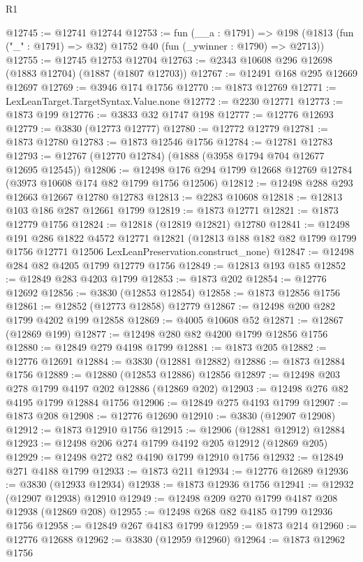 \begin{lexlean}{R1}
\begin{coremodule}
@12745 := @12741 @12744
@12753 := fun (__a : @1791) =>
  @198 (@1813 (fun ("_" : @1791) => @32) @1752 @40 (fun (_ywinner : @1790) => @2713))
@12755 := @12745 @12753 @12704
@12763 := @2343 @10608 @296 @12698 (@1883 @12704) (@1887 (@1807 @12703))
@12767 := @12491 @168 @295 @12669 @12697
@12769 := @3946 @174 @1756
@12770 := @1873 @12769
@12771 := LexLeanTarget.TargetSyntax.Value.none
@12772 := @2230 @12771
@12773 := @1873 @199
@12776 := @3833 @32 @1747 @198
@12777 := @12776 @12693
@12779 := @3830 (@12773 @12777)
@12780 := @12772 @12779
@12781 := @1873 @12780
@12783 := @1873 @12546 @1756
@12784 := @12781 @12783
@12793 := @12767 (@12770 @12784) (@1888 (@3958 @1794 @704 @12677 @12695 @12545))
@12806 := @12498 @176 @294 @1799 @12668 @12769 @12784 (@3973 @10608 @174 @82 @1799 @1756 @12506)
@12812 := @12498 @288 @293 @12663 @12667 @12780 @12783
@12813 := @2283 @10608
@12818 := @12813 @103 @186 @287 @12661 @1799
@12819 := @1873 @12771
@12821 := @1873 @12779 @1756
@12824 := @12818 (@12819 @12821) @12780
@12841 := @12498
    @191
    @286
    @1822
    @4572
    @12771
    @12821
    (@12813 @188 @182 @82 @1799 @1799 @1756 @12771 @12506 LexLeanPreservation.construct_none)
@12847 := @12498 @284 @82 @4205 @1799 @12779 @1756
@12849 := @12813 @193 @185
@12852 := @12849 @283 @4203 @1799
@12853 := @1873 @202
@12854 := @12776 @12692
@12856 := @3830 (@12853 @12854)
@12858 := @1873 @12856 @1756
@12861 := @12852 (@12773 @12858) @12779
@12867 := @12498 @200 @282 @1799 @4202 @199 @12858
@12869 := @4005 @10608 @52
@12871 := @12867 (@12869 @199)
@12877 := @12498 @280 @82 @4200 @1799 @12856 @1756
@12880 := @12849 @279 @4198 @1799
@12881 := @1873 @205
@12882 := @12776 @12691
@12884 := @3830 (@12881 @12882)
@12886 := @1873 @12884 @1756
@12889 := @12880 (@12853 @12886) @12856
@12897 := @12498 @203 @278 @1799 @4197 @202 @12886 (@12869 @202)
@12903 := @12498 @276 @82 @4195 @1799 @12884 @1756
@12906 := @12849 @275 @4193 @1799
@12907 := @1873 @208
@12908 := @12776 @12690
@12910 := @3830 (@12907 @12908)
@12912 := @1873 @12910 @1756
@12915 := @12906 (@12881 @12912) @12884
@12923 := @12498 @206 @274 @1799 @4192 @205 @12912 (@12869 @205)
@12929 := @12498 @272 @82 @4190 @1799 @12910 @1756
@12932 := @12849 @271 @4188 @1799
@12933 := @1873 @211
@12934 := @12776 @12689
@12936 := @3830 (@12933 @12934)
@12938 := @1873 @12936 @1756
@12941 := @12932 (@12907 @12938) @12910
@12949 := @12498 @209 @270 @1799 @4187 @208 @12938 (@12869 @208)
@12955 := @12498 @268 @82 @4185 @1799 @12936 @1756
@12958 := @12849 @267 @4183 @1799
@12959 := @1873 @214
@12960 := @12776 @12688
@12962 := @3830 (@12959 @12960)
@12964 := @1873 @12962 @1756

\end{coremodule}
\end{lexlean}
